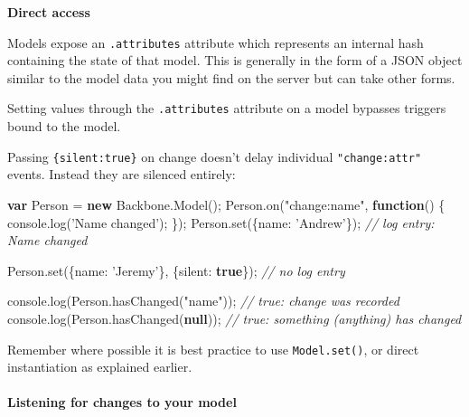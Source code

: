\documentclass[9pt]{book}
\newenvironment{Shaded}{}{}
\newcommand{\KeywordTok}[1]{\textcolor[rgb]{0.00,0.44,0.13}{\textbf{{#1}}}}
\newcommand{\DataTypeTok}[1]{\textcolor[rgb]{0.56,0.13,0.00}{{#1}}}
\newcommand{\StringTok}[1]{\textcolor[rgb]{0.25,0.44,0.63}{{#1}}}
\newcommand{\CommentTok}[1]{\textcolor[rgb]{0.38,0.63,0.69}{\textit{{#1}}}}
\newcommand{\OtherTok}[1]{\textcolor[rgb]{0.00,0.44,0.13}{{#1}}}
\newcommand{\FunctionTok}[1]{\textcolor[rgb]{0.02,0.16,0.49}{{#1}}}
\newcommand{\NormalTok}[1]{{#1}}
\begin{document}
\textbf{Direct access}

Models expose an \texttt{.attributes} attribute which represents an
internal hash containing the state of that model. This is generally in
the form of a JSON object similar to the model data you might find on
the server but can take other forms.

Setting values through the \texttt{.attributes} attribute on a model
bypasses triggers bound to the model.

Passing \texttt{\{silent:true\}} on change doesn't delay individual
\texttt{"change:attr"} events. Instead they are silenced entirely:

\begin{Shaded}
\begin{Highlighting}[]
\KeywordTok{var} \NormalTok{Person = }\KeywordTok{new} \OtherTok{Backbone}\NormalTok{.}\FunctionTok{Model}\NormalTok{();}
\OtherTok{Person}\NormalTok{.}\FunctionTok{on}\NormalTok{(}\StringTok{"change:name"}\NormalTok{, }\KeywordTok{function}\NormalTok{() \{ }\OtherTok{console}\NormalTok{.}\FunctionTok{log}\NormalTok{(}\StringTok{'Name changed'}\NormalTok{); \});}
\OtherTok{Person}\NormalTok{.}\FunctionTok{set}\NormalTok{(\{}\DataTypeTok{name}\NormalTok{: }\StringTok{'Andrew'}\NormalTok{\});}
\CommentTok{// log entry: Name changed}

\OtherTok{Person}\NormalTok{.}\FunctionTok{set}\NormalTok{(\{}\DataTypeTok{name}\NormalTok{: }\StringTok{'Jeremy'}\NormalTok{\}, \{}\DataTypeTok{silent}\NormalTok{: }\KeywordTok{true}\NormalTok{\});}
\CommentTok{// no log entry}

\OtherTok{console}\NormalTok{.}\FunctionTok{log}\NormalTok{(}\OtherTok{Person}\NormalTok{.}\FunctionTok{hasChanged}\NormalTok{(}\StringTok{"name"}\NormalTok{));}
\CommentTok{// true: change was recorded}
\OtherTok{console}\NormalTok{.}\FunctionTok{log}\NormalTok{(}\OtherTok{Person}\NormalTok{.}\FunctionTok{hasChanged}\NormalTok{(}\KeywordTok{null}\NormalTok{));}
\CommentTok{// true: something (anything) has changed}
\end{Highlighting}
\end{Shaded}

Remember where possible it is best practice to use \texttt{Model.set()},
or direct instantiation as explained earlier.

\paragraph{Listening for changes to your
model}\label{listening-for-changes-to-your-model}
\end{document}
